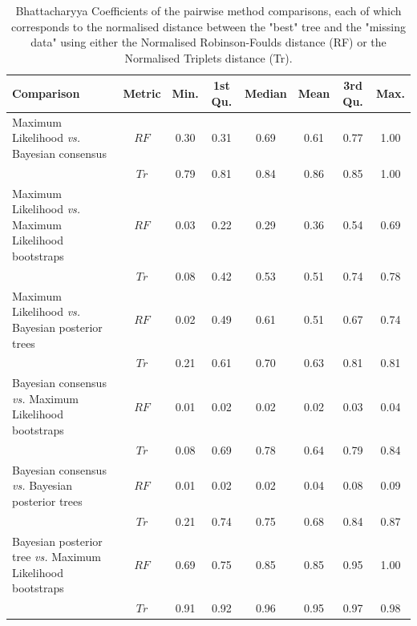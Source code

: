 \begin{landscape}
\begin{table}[ht]
\caption{Bhattacharyya Coefficients of the pairwise method comparisons, each of which corresponds to the normalised distance between the "best" tree and the "missing data" using either the Normalised Robinson-Foulds distance (RF) or the Normalised Triplets distance (Tr).}
\label{Tab_Supp_summary_BC_ML}
\centering
\begin{tabular}{lccccccc}
  \hline
 Comparison &  Metric & Min. & 1st Qu. & Median & Mean & 3rd Qu. & Max. \\ 
  \hline
    Maximum Likelihood \textit{vs.} Bayesian consensus                 & $RF$ & 0.30 & 0.31 & 0.69 & 0.61 & 0.77 & 1.00 \\ 
                                                                       & $Tr$ & 0.79 & 0.81 & 0.84 & 0.86 & 0.85 & 1.00 \\ 
    Maximum Likelihood \textit{vs.} Maximum Likelihood bootstraps      & $RF$ & 0.03 & 0.22 & 0.29 & 0.36 & 0.54 & 0.69 \\ 
                                                                       & $Tr$ & 0.08 & 0.42 & 0.53 & 0.51 & 0.74 & 0.78 \\ 
    Maximum Likelihood \textit{vs.} Bayesian posterior trees           & $RF$ & 0.02 & 0.49 & 0.61 & 0.51 & 0.67 & 0.74 \\ 
                                                                       & $Tr$ & 0.21 & 0.61 & 0.70 & 0.63 & 0.81 & 0.81 \\ 
    Bayesian consensus \textit{vs.} Maximum Likelihood bootstraps      & $RF$ & 0.01 & 0.02 & 0.02 & 0.02 & 0.03 & 0.04 \\ 
                                                                       & $Tr$ & 0.08 & 0.69 & 0.78 & 0.64 & 0.79 & 0.84 \\ 
    Bayesian consensus \textit{vs.} Bayesian posterior trees           & $RF$ & 0.01 & 0.02 & 0.02 & 0.04 & 0.08 & 0.09 \\ 
                                                                       & $Tr$ & 0.21 & 0.74 & 0.75 & 0.68 & 0.84 & 0.87 \\ 
    Bayesian posterior tree \textit{vs.} Maximum Likelihood bootstraps & $RF$ & 0.69 & 0.75 & 0.85 & 0.85 & 0.95 & 1.00 \\ 
                                                                       & $Tr$ & 0.91 & 0.92 & 0.96 & 0.95 & 0.97 & 0.98 \\ 
   \hline
\end{tabular}
\end{table}
\end{landscape}

